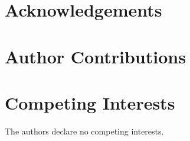 \section*{Acknowledgements}
\label{sec:acknowledgements}


\section*{Author Contributions}
\label{sec:author_contributions}


\section*{Competing Interests}
\label{sec:competing_interests}

The authors declare no competing interests.

